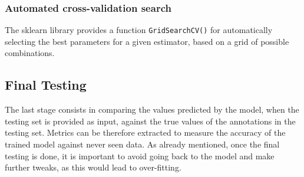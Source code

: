 \subsubsection{Automated cross-validation search}

The sklearn library provides a function \texttt{GridSearchCV()} for automatically selecting the best parameters for a given estimator, based on a grid of possible combinations.



\subsection{Final Testing}

The last stage consists in comparing the values predicted by the model, when the testing set is provided as input, against the true values of the annotations in the testing set. Metrics can be therefore extracted to measure the accuracy of the trained model against never seen data. As already mentioned, once the final testing is done, it is important to avoid going back to the model and make further tweaks, as this would lead to over-fitting.

